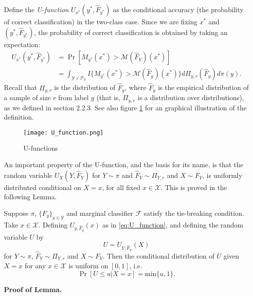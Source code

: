 \documentclass[12pt]{article}
\begin{document}
Define the \emph{U-function} $U_{x^*}(y^*, \hat{F}_{y^*})$ as the
conditional accuracy (the probability of correct classification) in
the two-class case.  Since we are fixing $x^*$ and $(y^*,
\hat{F}_{y^*})$, the probability of correct classification is obtained
by taking an expectation:
\begin{align}\label{eq:U_function}
U_{x^*}(y^*, \hat{F}_{y^*}) &= \Pr[M_{y^*}(x^*) > \mathcal{M}(\hat{F}_Y)(x^*)]
\\&= \int_{\mathcal{Y} \times \mathcal{P}_{\mathcal{Y}}} 
I\{
M_{y^*}(x^*) > \mathcal{M}(\hat{F}_{y})(x^*)
\}
d\Pi_{y, r}(\hat{F}_y)
d\pi(y).
\end{align}
Recall that $\Pi_{y,r}$ is the distribution of $\hat{F}_y$, where
$\hat{F}_y$ is the empirical distribution of a sample of size $r$ from
label $y$ (that is, $\Pi_{y,r}$ is a distribution over distributions), as we defined in section 2.2.3.
See also figure \ref{fig:U_function} for an graphical illustration of
the definition.

\begin{figure}[h]
\centering
\texttt{[image: U\_function.png]}
\caption{U-functions}\label{fig:U_function}
\end{figure}

An important property of the U-function, and the basis for its name,
is that the random variable $U_X(Y, \hat{F}_Y)$ for $Y \sim \pi$ and
$\hat{F}_Y \sim \Pi_{Y, r}$ and $X \sim F_Y$, is uniformly distributed
conditional on $X=x$, for all fixed $x \in \mathcal{X}$.  This is
proved in the following Lemma.

\begin{lemma}\label{lemma:U_function}
Suppose $\pi$, $\{F_y\}_{y \in \mathcal{Y}}$ and marginal classifier
$\mathcal{F}$ satisfy the tie-breaking condition.  Take $x \in \mathcal{X}$.  Defining
$U_{y,\hat{F}_y}(x)$ as in \eqref{eq:U_function}, and defining the
random variable $U$ by
\[U = U_{Y, \hat{F}_Y}(X)\]
for $Y \sim \pi$, $\hat{F}_Y \sim \Pi_{Y, r}$ and $X \sim F_Y$.  Then
the conditional distribution of $U$ given $X = x$ for any $x \in
\mathcal{X}$ is uniform on $[0,1]$, i.e.
\[
\Pr[U \leq u|X =x] = \text{min}\{u, 1\}.
\]
\end{lemma}

\textbf{Proof of Lemma.}

\end{document}

